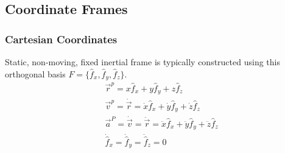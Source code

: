 \documentclass[conference]{IEEEtran}
\begin{document}
\subsection{Coordinate Frames}
\subsubsection{Cartesian Coordinates}
Static, non-moving, fixed inertial frame is typically constructed using this orthogonal basis $F = \{\hat{f}_x, \hat{f}_y, \hat{f}_z\}$.
\begin{align*}
    & \vec{r}^p = x \hat{f}_x + y \hat{f}_y + z \hat{f}_z \\
    & \vec{v}^p = \dot{\vec{r}} = \dot{x} \hat{f}_x + \dot{y} \hat{f}_y + \dot{z} \hat{f}_z \\
    & \vec{a}^P = \dot{\vec{v}} = \ddot{\vec{r}} = \ddot{x} \hat{f}_x + \ddot{y} \hat{f}_y + \ddot{z} \hat{f}_z \\
    & \dot{\hat{f}}_x = \dot{\hat{f}}_y = \dot{\hat{f}}_z = 0
\end{align*}
\end{document}
